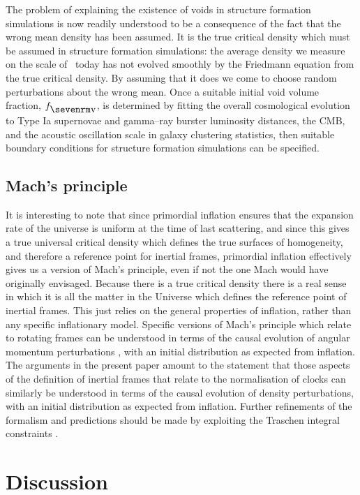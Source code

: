 \documentclass[12pt]{article}
\begin{document}
The problem of explaining the existence of voids in structure formation
simulations is now readily understood to be a consequence of the fact that
the wrong mean density has been assumed. It is the true critical density
which must be assumed in structure formation simulations: the average
density we measure on the scale of \SS\ today has not evolved smoothly
by the Friedmann equation from the true critical density. By assuming
that it does we come to choose random perturbations about the wrong mean.
Once a suitable initial void volume fraction, $\fv$, is determined by fitting
the overall cosmological evolution to Type Ia supernovae and gamma--ray
burster luminosity distances, the CMB, and the acoustic oscillation scale
in galaxy clustering statistics, then suitable boundary conditions for
structure formation simulations can be specified.

\subsection{Mach's principle}

It is interesting to note that since primordial inflation ensures that
the expansion rate of the universe is uniform at the time of last
scattering, and since this gives a true universal critical density which
defines the true surfaces of homogeneity, and therefore a reference
point for inertial frames, primordial inflation effectively gives us a
version of Mach's principle, even if not the one Mach would have originally
envisaged. Because there is a true critical density there is a real sense
in which it is all the matter in the Universe which defines the reference
point of inertial frames. This
just relies on the general properties of inflation, rather than any
specific inflationary model. Specific versions of Mach's principle
which relate to rotating frames can be understood in terms of the
causal evolution of angular momentum perturbations \cite{Mach1,Mach2},
with an initial distribution as expected from inflation. The arguments in
the present paper amount to the statement that those aspects of
the definition of inertial frames that relate to the normalisation of
clocks can similarly be understood in terms of the causal evolution
of density perturbations, with an initial distribution as expected from
inflation. Further refinements of the formalism and predictions should be made
by exploiting the Traschen integral constraints \cite{Traschen1,Traschen2}.

\section{Discussion\label{dis}}
\end{document}
